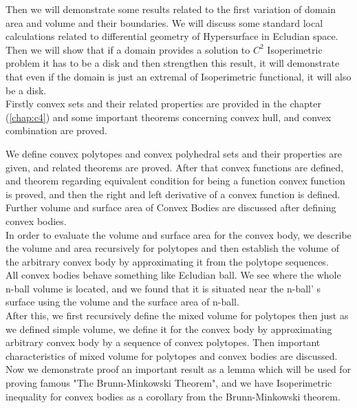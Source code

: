 \documentclass[oneside]{book}
\begin{document}
	Then we will demonstrate some results related to the first variation of domain area and volume and their boundaries. We will discuss some standard local calculations related to differential geometry of Hypersurface in Ecludian space.\\
	Then we will show that if a domain provides a solution to $C^{2}$ Isoperimetric problem it has to be a disk and then strengthen this result, it will demonstrate that even if the domain is just an extremal of Isoperimetric functional, it will also be a disk.\\
	
	
	
	
	
	Firstly convex sets and their related properties are provided in the chapter (\ref{chap:c4}) and some important theorems concerning convex hull, and convex combination are proved. 
	
	
	
	
	We define convex polytopes and convex polyhedral sets and their properties are given, and related theorems are proved. After that convex functions are defined, and theorem regarding equivalent condition for being a function convex function is proved, and then the right and left derivative of a convex function is defined.\\
	Further volume and surface area of Convex Bodies are discussed after defining convex bodies.\\
	In order to evaluate the volume and surface area for the convex body, we describe the volume and area recursively for polytopes and then establish the volume of the arbitrary convex body by approximating it from the polytope sequences. 
	\\ 
	
	All convex bodies behave something like Ecludian ball. We see where the whole n-ball volume is located, and we found that it is situated near the n-ball' s surface using the volume and the surface area of n-ball.
	\\
	
	
	
	
	After this, we first recursively define the mixed volume for polytopes then just as we defined simple volume, we define it for the convex body by approximating arbitrary convex body by a sequence of convex polytopes. Then important characteristics of mixed volume for polytopes and convex bodies are discussed. \\ Now we demonstrate proof an important result as a lemma which will be used for proving famous "The Brunn-Minkowski Theorem", and we have Isoperimetric inequality for convex bodies as a corollary from the Brunn-Minkowski theorem. \\
	
\end{document}
